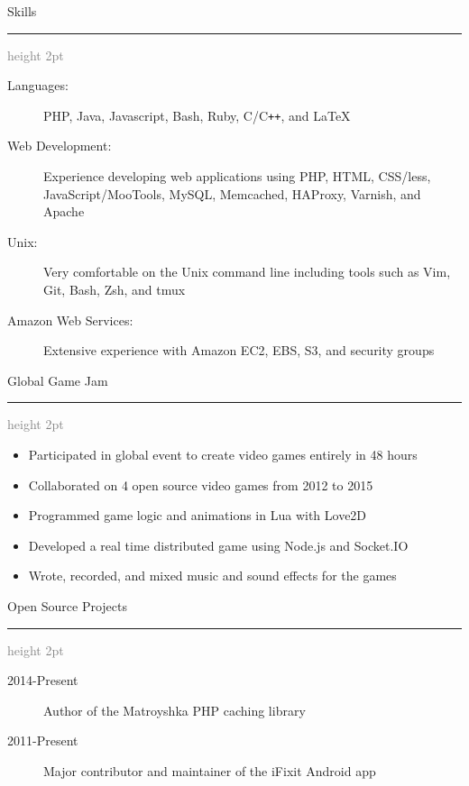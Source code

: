 \documentclass[letterpaper,11pt]{article}
\newcommand{\ressectiondivider}{
   \vspace{5pt}
   \textcolor{gray}{\hrule height 2pt}
}
\newcommand{\resitem}[1]{\item #1 \vspace{-2pt}}
\newcommand{\resheading}[1]{
   \vspace{4pt}
   {\Large #1}
   \ressectiondivider
   \vspace{10pt}
}
\begin{document}
\resheading{Skills}

\begin{description}
   \item[Languages:]
   PHP, Java, Javascript, Bash, Ruby, C/C{}\verb!++!, and \LaTeX
   \item[Web Development:]
   Experience developing web applications using PHP, HTML, CSS/less, JavaScript/MooTools, MySQL, Memcached, HAProxy, Varnish, and Apache
   \item[Unix:]
   Very comfortable on the Unix command line including tools such as Vim, Git, Bash, Zsh, and tmux
   \item[Amazon Web Services:]
   Extensive experience with Amazon EC2, EBS, S3, and security groups
\end{description}

\resheading{Global Game Jam}

\begin{itemize}
   \resitem{Participated in global event to create video games entirely in 48 hours}
   \resitem{Collaborated on 4 open source video games from 2012 to 2015}
   \resitem{Programmed game logic and animations in Lua with Love2D}
   \resitem{Developed a real time distributed game using Node.js and Socket.IO}
   \resitem{Wrote, recorded, and mixed music and sound effects for the games}
\end{itemize}

\resheading{Open Source Projects}

\begin{description}
   \item[2014-Present] Author of the Matroyshka PHP caching library
   \item[2011-Present] Major contributor and maintainer of the iFixit Android app
\end{description}
\end{document}

